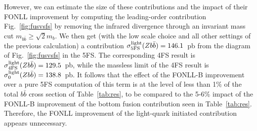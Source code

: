 \documentclass[12pt]{article}
\begin{document}
However, we can estimate the size of these contributions and the
impact of their FONLL improvement by computing
the leading-order contribution Fig.~\ref{fig:fusvsfs} by removing the
infrared divergence through  an
invariant mass cut $m_{b\bar b}\ge \sqrt{2} m_b$. We then get (with the
low scale choice and all other settings of the previous calculation) a
contribution $\sigma^{\rm light}_{\rm 5FS}(Zb\bar b)=146.1$~pb from the diagram
of Fig.~\ref{fig:fusvsfs} in the 5FS. The corresponding 4FS result is 
$\sigma^{\rm light}_{\rm 4FS}(Zb\bar b)=129.5$~pb, while the massless
limit of the 4FS result is $\sigma^{\rm light}_{\rm 0}(Zb\bar
b)=138.8$~pb. It follows that the effect of the FONLL-B improvement
over a pure 5FS computation of this term is at the level of less than 
1\% of the total $b\bar{b}$ cross section of
Table~\ref{tab:res}, 
to be compared
to the 5-6\%  impact of the FONLL-B improvement 
of the bottom fusion
contribution seen in
Table~\ref{tab:res}. Therefore, the  FONLL improvement of the
light-quark initiated contribution appears unnecessary. 
\end{document}
